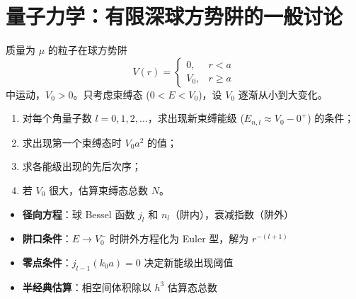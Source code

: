 \section{量子力学：有限深球方势阱的一般讨论}
\label{sec:finite-spherical-well}

\begin{modelbox}[题目：有限深球方势阱的一般讨论]
质量为 $\mu$ 的粒子在球方势阱
\[
V(r)=\begin{cases}0, & r<a \\ V_0, & r\ge a\end{cases}
\]
中运动，$V_0>0$。只考虑束缚态 ($0<E<V_0$)，设 $V_0$ 逐渐从小到大变化。
\begin{enumerate}
    \item 对每个角量子数 $l=0,1,2,\ldots$，求出现新束缚能级 ($E_{n,l}\approx V_0-0^+$) 的条件；
    \item 求出现第一个束缚态时 $V_0a^2$ 的值；
    \item 求各能级出现的先后次序；
    \item 若 $V_0$ 很大，估算束缚态总数 $N$。
\end{enumerate}
\end{modelbox}

\begin{tipbox}[考点快速分析]
\begin{itemize}
    \item \textbf{径向方程}：球 Bessel 函数 $j_l$ 和 $n_l$（阱内），衰减指数（阱外）
    \item \textbf{阱口条件}：$E\to V_0^-$ 时阱外方程化为 Euler 型，解为 $r^{-(l+1)}$
    \item \textbf{零点条件}：$j_{l-1}(k_0a)=0$ 决定新能级出现阈值
    \item \textbf{半经典估算}：相空间体积除以 $h^3$ 估算态总数
\end{itemize}
\end{tipbox}


